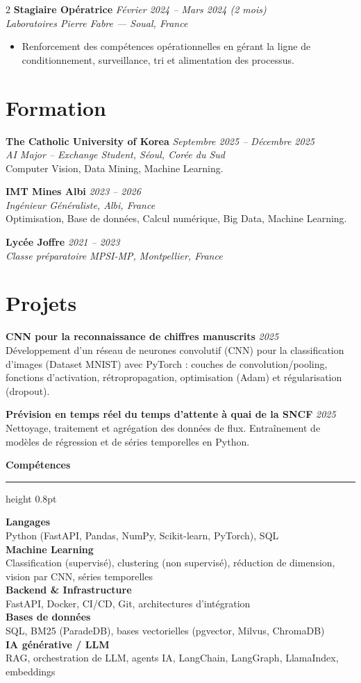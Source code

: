 \documentclass[10.5pt,a4paper]{article}
\newcommand{\sectionrule}{\vspace{-6pt}{\color{accent}\hrule height 1pt}\vspace{2pt}}
\newcommand{\subsectitle}[1]{%
  {\color{accent}\bfseries\large #1}\\[-2pt]
  {\color{accent}\hrule height 0.8pt}\vspace{4pt}
}
\newcommand{\cvexp}[5]{%
  \noindent\textbf{#1} \hfill {\itshape\color{graytext}\small #4}\\
  {\itshape #2 --- #3}\\[-2pt]
  #5
  \vspace{5pt}
}
\newcommand{\cvedu}[5]{%
  \noindent\textbf{#1} \hfill {\itshape\color{graytext}\small #4}\\
  {\itshape #2, #3}\\[1pt]
  {\small #5}
  \vspace{2pt}
}
\newcommand{\cveduplain}[4]{%
  \noindent\textbf{#1} \hfill {\itshape\color{graytext}\small #4}\\
  {\itshape #2, #3}
  \vspace{2pt}
}
\newcommand{\cvproject}[3]{%
  \noindent\textbf{#1} \hfill {\itshape\color{graytext}\small #2}\\[1pt]
  {\small #3}
  \vspace{2pt}
}
\newcommand{\sidebarline}[2]{%
  \noindent\textbf{\small #1}\\
  {\small #2}\\[3pt]
}
\begin{document}
\begin{paracol}{2}
\cvexp{Stagiaire Opératrice}{Laboratoires Pierre Fabre}{Soual, France}{Février 2024 -- Mars 2024 (2 mois)}{%
  \begin{itemize}[leftmargin=12pt, itemsep=2pt, topsep=0pt, partopsep=0pt, parsep=0pt]
    \item Renforcement des compétences opérationnelles en gérant la ligne de conditionnement, surveillance, tri et alimentation des processus.
  \end{itemize}
}

\section*{Formation}
\sectionrule

\cvedu{The Catholic University of Korea}{AI Major -- Exchange Student}{Séoul, Corée du Sud}{Septembre 2025 -- Décembre 2025}{Computer Vision, Data Mining, Machine Learning.}

\cvedu{IMT Mines Albi}{Ingénieur Généraliste}{Albi, France}{2023 -- 2026}{Optimisation, Base de données, Calcul numérique, Big Data, Machine Learning.}

\cveduplain{Lycée Joffre}{Classe préparatoire MPSI-MP}{Montpellier, France}{2021 -- 2023}

\section*{Projets}
\sectionrule

\cvproject{CNN pour la reconnaissance de chiffres manuscrits}{2025}{Développement d'un réseau de neurones convolutif (CNN) pour la classification d'images (Dataset MNIST) avec PyTorch : couches de convolution/pooling, fonctions d'activation, rétropropagation, optimisation (Adam) et régularisation (dropout).}

\cvproject{Prévision en temps réel du temps d'attente à quai de la SNCF}{2025}{Nettoyage, traitement et agrégation des données de flux. Entraînement de modèles de régression et de séries temporelles en Python.}


\switchcolumn

\vspace{2pt}

\subsectitle{Compétences}

\sidebarline{Langages}{Python (FastAPI, Pandas, NumPy, Scikit-learn, PyTorch), SQL}
\sidebarline{Machine Learning}{Classification (supervisé), clustering (non supervisé), réduction de dimension, vision par CNN, séries temporelles}
\sidebarline{Backend \& Infrastructure}{FastAPI, Docker, CI/CD, Git, architectures d'intégration}
\sidebarline{Bases de données}{SQL, BM25 (ParadeDB), bases vectorielles (pgvector, Milvus, ChromaDB)}
\sidebarline{IA générative / LLM}{RAG, orchestration de LLM, agents IA, LangChain, LangGraph, LlamaIndex, embeddings}


\end{paracol}
\end{document}
